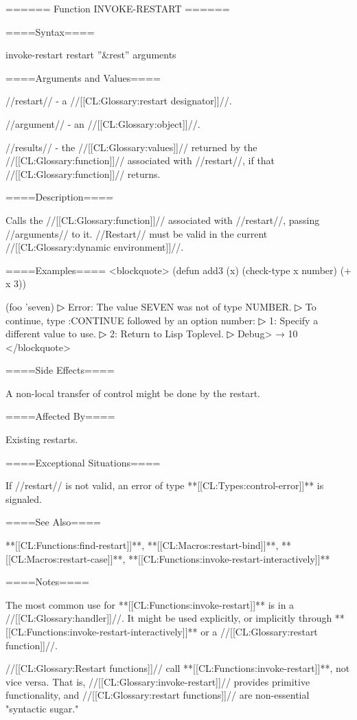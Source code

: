 ====== Function INVOKE-RESTART ======

====Syntax====

\DefunWithValues invoke-restart {restart ''&rest'' arguments} {}

====Arguments and Values====

//restart// - a //[[CL:Glossary:restart designator]]//.

//argument// - an //[[CL:Glossary:object]]//.

//results// - the //[[CL:Glossary:values]]// returned by the //[[CL:Glossary:function]]// associated with //restart//, if that //[[CL:Glossary:function]]// returns.

====Description====

Calls the //[[CL:Glossary:function]]// associated with //restart//, passing //arguments// to it. //Restart// must be valid in the current //[[CL:Glossary:dynamic environment]]//.

====Examples==== <blockquote> (defun add3 (x) (check-type x number) (+ x 3))

(foo 'seven)
▷ Error: The value SEVEN was not of type NUMBER.
▷ To continue, type :CONTINUE followed by an option number:
▷ 1: Specify a different value to use.
▷ 2: Return to Lisp Toplevel.
▷ Debug>  → 10 </blockquote>

====Side Effects====

A non-local transfer of control might be done by the restart.

====Affected By====

Existing restarts.

====Exceptional Situations====

If //restart// is not valid, an error of type **[[CL:Types:control-error]]** is signaled.

====See Also====

**[[CL:Functions:find-restart]]**, **[[CL:Macros:restart-bind]]**, **[[CL:Macros:restart-case]]**, **[[CL:Functions:invoke-restart-interactively]]**

====Notes====

The most common use for **[[CL:Functions:invoke-restart]]** is in a //[[CL:Glossary:handler]]//. It might be used explicitly, or implicitly through **[[CL:Functions:invoke-restart-interactively]]** or a //[[CL:Glossary:restart function]]//.

//[[CL:Glossary:Restart functions]]// call **[[CL:Functions:invoke-restart]]**, not vice versa. That is, //[[CL:Glossary:invoke-restart]]// provides primitive functionality, and //[[CL:Glossary:restart functions]]// are non-essential "syntactic sugar."

